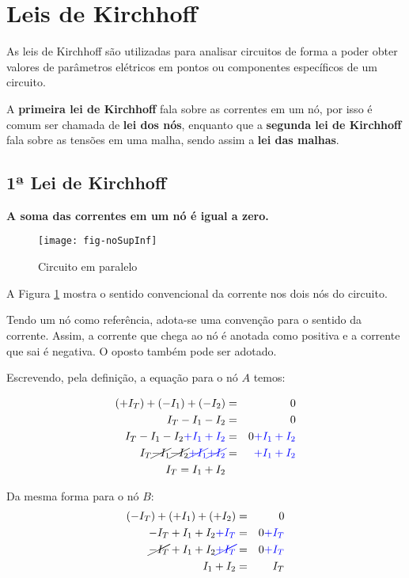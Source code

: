 \section{Leis de Kirchhoff}

As leis de Kirchhoff são utilizadas para analisar circuitos de forma a poder obter valores de parâmetros elétricos em pontos ou componentes específicos de um circuito.

A \textbf{primeira lei de Kirchhoff} fala sobre as correntes em um nó, por isso é comum ser chamada de \textbf{lei dos nós}, enquanto que a \textbf{segunda lei de Kirchhoff} fala sobre as tensões em uma malha, sendo assim a \textbf{lei das malhas}.





\subsection{1ª Lei de Kirchhoff}

\textbf{A soma das correntes em um nó é igual a zero.}

\begin{figure}[!h]
	\centering
	\caption{Circuito em paralelo}
	\texttt{[image: fig-noSupInf]}
	\label{fig:nosAeB}
\end{figure}


A Figura \ref{fig:nosAeB} mostra o sentido convencional da corrente nos dois nós do circuito.

Tendo um nó como referência, adota-se uma convenção para o sentido da corrente. Assim, a corrente que chega ao nó é anotada como positiva e a corrente que sai é negativa. O oposto também pode ser adotado.

Escrevendo, pela definição, a equação para o nó $A$ temos:

\begin{eqnarray}
\label{eq:1kirchhoff}
(+I_T) + (-I_1) + (-I_2) & = & 0\\
I_T - I_1 - I_2 & = & 0 \nonumber\\
I_T - I_1 - I_2 \color{blue}{+ I_1 + I_2}& = & 0 \color{blue}{+I_1 + I_2} \nonumber\\
I_T \cancel{-I_1} \cancel{- I_2} \color{blue}{\cancel{+ I_1} \cancel{+ I_2}}& = & \color{blue}{+I_1 + I_2} \nonumber\\
I_T = I_1 + I_2
\end{eqnarray}

Da mesma forma para o nó $B$:
\begin{eqnarray}
(-I_T) + (+I_1) + (+I_2) & = & 0 \nonumber\\
-I_T + I_1 + I_2 \color{blue}{+I_T}& = & 0\color{blue}{+I_T} \nonumber\\
\cancel{-I_T} + I_1 + I_2 \color{blue}{\cancel{+I_T}}& = & 0\color{blue}{+I_T} \nonumber\\
I_1 + I_2 & = & I_T \nonumber
\end{eqnarray}












